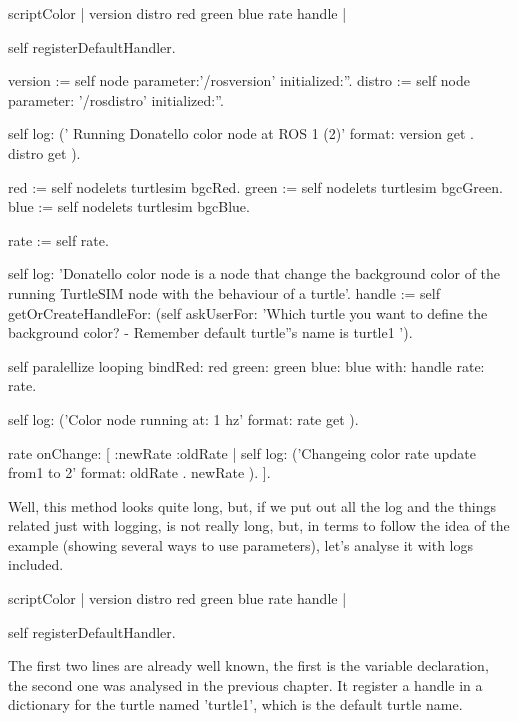 \documentclass[a4paper,10pt,twoside]{book}
\begin{document}
			
			\begin{code}
scriptColor
	| version distro red green blue  rate handle |
	
	self registerDefaultHandler.
	
	version := self node parameter:'/rosversion' initialized:''.
	distro := self node parameter: '/rosdistro'	initialized:''.

	self log: (' Running Donatello color node at ROS {1} ({2})' format: { version get . distro get }).
	
	red :=  self nodelets turtlesim bgcRed.
	green :=  self nodelets turtlesim bgcGreen.
	blue :=  self nodelets turtlesim bgcBlue.

	rate :=  self rate.

	self log: 'Donatello color node is a node that change the background color of the running TurtleSIM node with the behaviour of a turtle'.
	handle := self getOrCreateHandleFor: (self askUserFor: 'Which turtle you want to define the background color? - Remember default turtle''s name is turtle1 ').
	
	self paralellize looping 
					bindRed: red 
					green: green 
					blue: blue 
					with: handle 
					rate: rate.
	
	self log: ('Color node running at: {1} hz' format: { rate get }).
	
	rate onChange: [ :newRate :oldRate | 
		self log: ('Changeing color rate update from{1} to {2}' format: { oldRate . newRate }).	
	 ].
			
			\end{code}
			 
			 
			 
		Well, this method looks quite long, but, if we put out all the log and the things related just with logging, is not really long, but, in terms to follow the idea of the example (showing several ways to use parameters), let's analyse it with logs included.
			 
			
		\begin{code}
scriptColor
	| version distro red green blue  rate handle |
	
	self registerDefaultHandler.
	
		\end{code}
		
		
		The first two lines are already well known, the first is the variable declaration, the second one was analysed in the previous chapter. It register a handle in a dictionary for the turtle named 'turtle1', which is the default turtle name.
		
\end{document}
